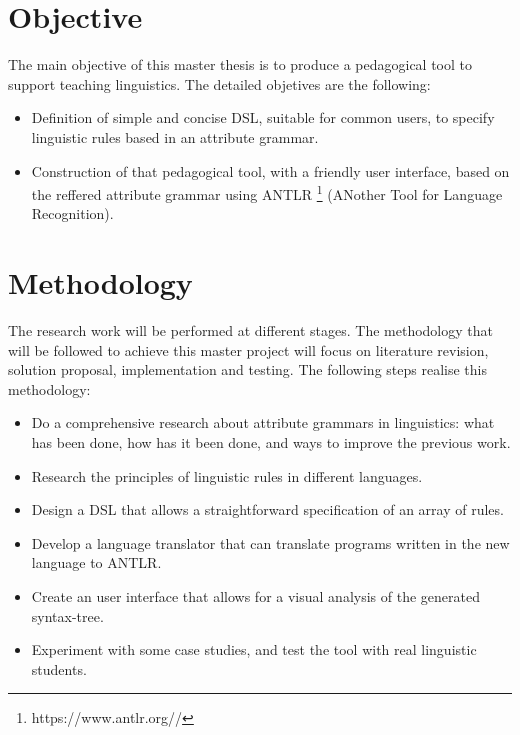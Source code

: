 	
\section{Objective}
The main objective of this master thesis is to produce a pedagogical tool to support teaching linguistics. The detailed objetives are the following:

\begin{itemize}
    \item Definition of simple and concise \textsc{DSL}, suitable for common users, to specify linguistic rules based in an attribute grammar.
    \item Construction of that pedagogical tool, with a friendly user interface, based on the reffered attribute grammar using \textsc{ANTLR} \footnote{https://www.antlr.org//} (ANother Tool for Language Recognition).
\end{itemize}
    
\section{Methodology}
The research work will be performed at different stages. The methodology that will be followed to achieve this master project will focus on literature revision, solution proposal, implementation and testing. The following steps realise this methodology:

\begin{itemize}
    \item Do a comprehensive research about attribute grammars in linguistics: what has been done, how has it been done, and ways to improve the previous work.
    \item Research the principles of linguistic rules in different languages.
    \item Design a \textsc{DSL} that allows a straightforward specification of an array of rules.
    \item Develop a language translator that can translate programs written in the new language to \textsc{ANTLR}.
    \item Create an user interface that allows for a visual analysis of the generated syntax-tree.
    \item Experiment with some case studies, and test the tool with real linguistic students.
\end{itemize}
    
